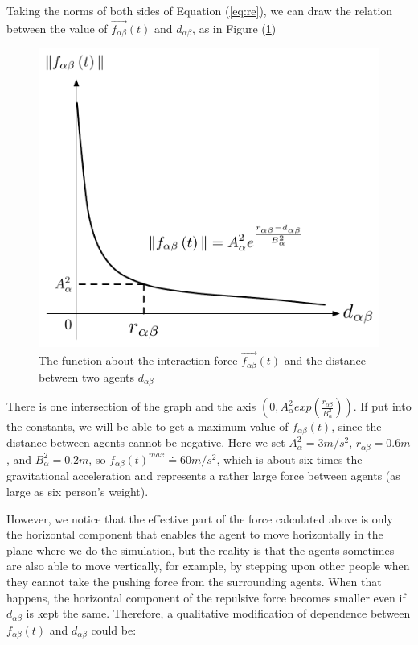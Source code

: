 Taking the norms of both sides of Equation (\ref{eq:re}), we can draw the relation 
between the value of $\overrightarrow{f_{\alpha\beta}}(t)$ and $d_{\alpha \beta}$, 
as in Figure (\ref{fig:physicalinteraction})\\
\begin{figure}
\centering
\includegraphics[scale=0.45]{Figures/physicalinteraction.pdf} 
\caption{The function about the interaction force $\vec{f_{\alpha\beta}}(t)$ and the distance between two agents
$d_{\alpha\beta}$ }\label{fig:physicalinteraction}
\end{figure}

There is one intersection of the graph and the axis $ \left( 0, A_{\alpha}^{2} exp\left( \frac{r_{\alpha\beta} }{B_{\alpha}^{2}}\right)  \right) $. 
If put into the constants, we will be able to get a maximum value of $ f_{\alpha\beta}(t) $, 
since the distance between agents cannot be negative. Here we set $ A_{\alpha}^{2} = 3 m/s^{2} $, 
$ r_{\alpha\beta} = 0.6 m $, and $ B_{\alpha}^{2} = 0.2 m $, so $ f_{\alpha\beta}(t)^{max} \doteq 60 m/s^{2} $, 
which is about six times the gravitational acceleration and represents a rather 
large force between agents (as large as six person's weight).

However, we notice that the effective part of the force calculated above is only the horizontal 
component that enables the agent to move horizontally in the plane where we do the simulation, 
but the reality is that the agents sometimes are also able to move vertically, for example, 
by stepping upon other people when they cannot take the pushing force from the surrounding agents. 
When that happens, the horizontal component of the repulsive force becomes smaller even if 
$d_{\alpha\beta}$ is kept the same.	Therefore, a qualitative modification of dependence between 
$ f_{\alpha\beta}(t) $ and $ d_{\alpha\beta} $ could be:


